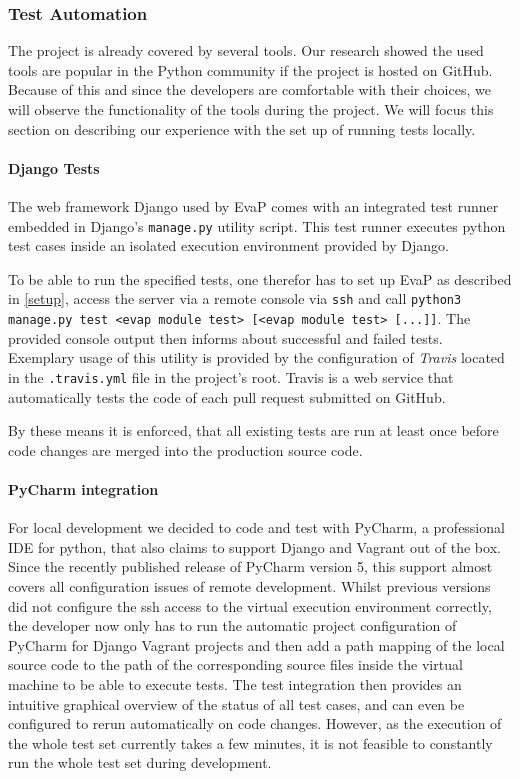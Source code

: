 \subsubsection{Test Automation}
The project is already covered by several tools.
Our research showed the used tools are popular in the Python community if the project is hosted on GitHub.
Because of this and since the developers are comfortable with their choices, we will observe the functionality of the tools during the project.
We will focus this section on describing our experience with the set up of running tests locally.

\paragraph{Django Tests}
The web framework Django used by EvaP comes with an integrated test runner embedded in Django's \texttt{manage.py} utility script.
This test runner executes python test cases inside an isolated execution environment provided by Django.

To be able to run the specified tests, one therefor has to set up EvaP as described in \autoref{setup}, access the server via a remote console via \texttt{ssh} and call \texttt{python3 manage.py test <evap module test> [<evap module test> [...]]}.
The provided console output then informs about successful and failed tests.
Exemplary usage of this utility is provided by the configuration of \textit{Travis} located in the \texttt{.travis.yml} file in the project's root.
Travis is a web service that automatically tests the code of each pull request submitted on GitHub.

By these means it is enforced, that all existing tests are run at least once before code changes are merged into the production source code.

\paragraph{PyCharm integration}
For local development we decided to code and test with PyCharm, a professional IDE for python, that also claims to support Django and Vagrant out of the box.
Since the recently published release of PyCharm version 5, this support almost covers all configuration issues of remote development.
Whilst previous versions did not configure the ssh access to the virtual execution environment correctly, the developer now only has to run the automatic project configuration of PyCharm for Django Vagrant projects and then add a path mapping of the local source code to the path of the corresponding source files inside the virtual machine to be able to execute tests.
The test integration then provides an intuitive graphical overview of the status of all test cases, and can even be configured to rerun automatically on code changes.
However, as the execution of the whole test set currently takes a few minutes, it is not feasible to constantly run the whole test set during development.

